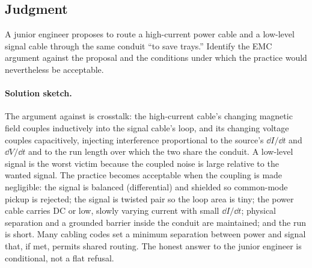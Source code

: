 \subsection*{Judgment}

\begin{exercise}
A junior engineer proposes to route a high-current power cable and a
low-level signal cable through the same conduit ``to save trays.''
Identify the EMC argument against the proposal and the conditions
under which the practice would nevertheless be acceptable.

\paragraph{Solution sketch.} The argument against is crosstalk: the
high-current cable's changing magnetic field couples inductively into
the signal cable's loop, and its changing voltage couples capacitively,
injecting interference proportional to the source's $\dd I/\dd t$ and
$\dd V/\dd t$ and to the run length over which the two share the
conduit. A low-level signal is the worst victim because the coupled
noise is large relative to the wanted signal. The practice becomes
acceptable when the coupling is made negligible: the signal is balanced
(differential) and shielded so common-mode pickup is rejected; the
signal is twisted pair so the loop area is tiny; the power cable carries
DC or low, slowly varying current with small $\dd I/\dd t$; physical
separation and a grounded barrier inside the conduit are maintained; and
the run is short. Many cabling codes set a minimum separation between
power and signal that, if met, permits shared routing. The honest answer
to the junior engineer is conditional, not a flat refusal.
\end{exercise}

